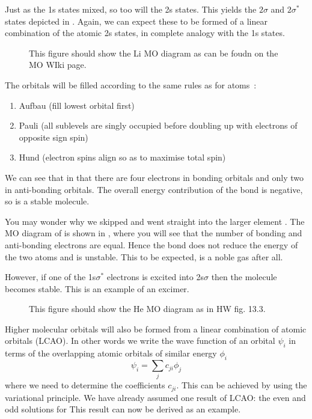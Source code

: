 Just as the 1s states mixed, so too will the 2s states. This yields the
$2\sigma$ and $2\sigma^*$ states depicted in
. Again, we can expect these to be formed of a linear
combination of the atomic 2s states, in complete analogy with the 1s states.

\begin{figure}
  \caption{This figure should show the Li MO diagram as can be foudn on the MO
  WIki page.}
  \label{diaspec:fig:LiMO}
\end{figure}

The orbitals will be filled according to the same rules as for atoms~\cite{}:
%
\begin{enumerate}
  \item Aufbau (fill lowest orbital first)
  \item Pauli (all sublevels are singly occupied before doubling up with
    electrons of opposite sign spin)
  \item Hund (electron spins align so as to maximise total spin)
\end{enumerate}
%
We can see that in  that there are four electrons in bonding orbitals
and only two in anti-bonding orbitals. The overall energy contribution of the
bond is negative, so   is a stable molecule.

You may wonder why we skipped  and went straight into the larger element
. The MO diagram of  is shown in ,
where you will see that the number of bonding and anti-bonding electrons are
equal. Hence the bond does not reduce the energy of the two atoms and 
is unstable. This to be expected,  is a noble gas after all.

However, if one of the 1s$\sigma^*$ electrons is excited into 2s$\sigma$ then
the  molecule becomes stable. This is an example of an excimer.

\begin{figure}
  \caption{This figure should show the He MO diagram as in HW fig. 13.3.}
  \label{diaspec:fig:HeMO}
\end{figure}

Higher molecular orbitals will also be formed from a linear combination of
atomic orbitals (LCAO). In other words we write the wave function of an orbital
$\psi_i$ in terms of the overlapping atomic orbitals of similar energy $\phi_i$
%
\begin{equation}
  \psi_i = \sum_j c_{ji} \phi_j
\end{equation}
%
where we need to determine the coefficients $c_{ji}$. This can be achieved by
using the variational principle. We have already assumed one result of LCAO: the
even and odd solutions for   This result can now be
derived as an example.

